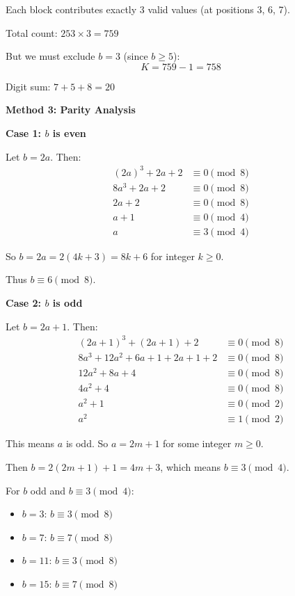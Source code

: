 \documentclass[11pt]{article}
\begin{document}
\begin{solutionbox}
Each block contributes exactly 3 valid values (at positions 3, 6, 7).

Total count: $253 \times 3 = 759$

But we must exclude $b = 3$ (since $b \geq 5$):
\[
K = 759 - 1 = 758
\]

Digit sum: $7 + 5 + 8 = 20$

\textbf{Method 3: Parity Analysis}

\textbf{Case 1: $b$ is even}

Let $b = 2a$. Then:
\begin{align*}
(2a)^3 + 2a + 2 &\equiv 0 \pmod{8} \\
8a^3 + 2a + 2 &\equiv 0 \pmod{8} \\
2a + 2 &\equiv 0 \pmod{8} \\
a + 1 &\equiv 0 \pmod{4} \\
a &\equiv 3 \pmod{4}
\end{align*}

So $b = 2a = 2(4k+3) = 8k + 6$ for integer $k \geq 0$.

Thus $b \equiv 6 \pmod{8}$.

\textbf{Case 2: $b$ is odd}

Let $b = 2a + 1$. Then:
\begin{align*}
(2a+1)^3 + (2a+1) + 2 &\equiv 0 \pmod{8} \\
8a^3 + 12a^2 + 6a + 1 + 2a + 1 + 2 &\equiv 0 \pmod{8} \\
12a^2 + 8a + 4 &\equiv 0 \pmod{8} \\
4a^2 + 4 &\equiv 0 \pmod{8} \\
a^2 + 1 &\equiv 0 \pmod{2} \\
a^2 &\equiv 1 \pmod{2}
\end{align*}

This means $a$ is odd. So $a = 2m + 1$ for some integer $m \geq 0$.

Then $b = 2(2m+1) + 1 = 4m + 3$, which means $b \equiv 3 \pmod{4}$.

For $b$ odd and $b \equiv 3 \pmod{4}$:
\begin{itemize}
    \item $b = 3$: $b \equiv 3 \pmod{8}$ \checkmark
    \item $b = 7$: $b \equiv 7 \pmod{8}$ \checkmark
    \item $b = 11$: $b \equiv 3 \pmod{8}$ \checkmark
    \item $b = 15$: $b \equiv 7 \pmod{8}$ \checkmark
\end{itemize}


\end{solutionbox}
\end{document}
